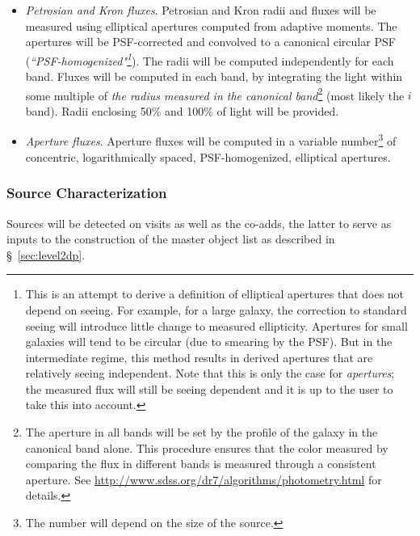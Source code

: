 \documentclass[12pt]{article}
\begin{document}
\begin{itemize}
    \item {\em Petrosian and Kron fluxes}. Petrosian and Kron radii and fluxes will be measured using elliptical apertures computed from adaptive moments. The apertures will be PSF-corrected and convolved to a canonical circular PSF ({\em ``PSF-homogenized"\footnote{This is an attempt to derive a definition of elliptical apertures that does not depend on seeing. For example, for a large galaxy, the correction to standard seeing will introduce little change to measured ellipticity. Apertures for small galaxies will tend to be circular (due to smearing by the PSF). But in the intermediate regime, this method results in derived apertures that are relatively seeing independent. Note that this is only the case for {\em apertures}; the measured flux will still be seeing dependent and it is up to the user to take this into account.}}). The radii will be computed independently for each band. Fluxes will be computed in each band, by integrating the light within some multiple of {\em the radius measured in the canonical band}\footnote{The aperture in all bands will be set by the profile of the galaxy in the canonical band alone. This procedure ensures that the color measured by comparing the flux in different bands is measured through a consistent aperture. See \url{http://www.sdss.org/dr7/algorithms/photometry.html} for details.} (most likely the $i$ band). Radii enclosing 50\% and 100\% of light will be provided.
    \item {\em Aperture fluxes}. Aperture fluxes will be computed in a variable number\footnote{The number will depend on the size of the source.} of concentric, logarithmically spaced, PSF-homogenized, elliptical apertures.

\end{itemize}

\subsubsection{Source Characterization}
\label{sec:sourceMeas}

Sources will be detected on visits as well as the co-adds, the latter to serve as inputs to the construction of the master object list as described in \S~\ref{sec:level2dp}.
\end{document}
